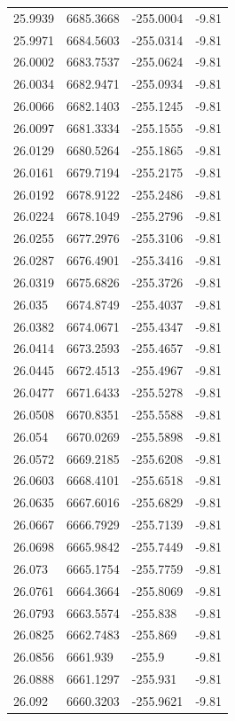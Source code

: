\begin{table}[H]
\begin{tabular}{llll}
25.9939 & 6685.3668 & -255.0004 & -9.81 \\
25.9971 & 6684.5603 & -255.0314 & -9.81 \\
26.0002 & 6683.7537 & -255.0624 & -9.81 \\
26.0034 & 6682.9471 & -255.0934 & -9.81 \\
26.0066 & 6682.1403 & -255.1245 & -9.81 \\
26.0097 & 6681.3334 & -255.1555 & -9.81 \\
26.0129 & 6680.5264 & -255.1865 & -9.81 \\
26.0161 & 6679.7194 & -255.2175 & -9.81 \\
26.0192 & 6678.9122 & -255.2486 & -9.81 \\
26.0224 & 6678.1049 & -255.2796 & -9.81 \\
26.0255 & 6677.2976 & -255.3106 & -9.81 \\
26.0287 & 6676.4901 & -255.3416 & -9.81 \\
26.0319 & 6675.6826 & -255.3726 & -9.81 \\
26.035 & 6674.8749 & -255.4037 & -9.81 \\
26.0382 & 6674.0671 & -255.4347 & -9.81 \\
26.0414 & 6673.2593 & -255.4657 & -9.81 \\
26.0445 & 6672.4513 & -255.4967 & -9.81 \\
26.0477 & 6671.6433 & -255.5278 & -9.81 \\
26.0508 & 6670.8351 & -255.5588 & -9.81 \\
26.054 & 6670.0269 & -255.5898 & -9.81 \\
26.0572 & 6669.2185 & -255.6208 & -9.81 \\
26.0603 & 6668.4101 & -255.6518 & -9.81 \\
26.0635 & 6667.6016 & -255.6829 & -9.81 \\
26.0667 & 6666.7929 & -255.7139 & -9.81 \\
26.0698 & 6665.9842 & -255.7449 & -9.81 \\
26.073 & 6665.1754 & -255.7759 & -9.81 \\
26.0761 & 6664.3664 & -255.8069 & -9.81 \\
26.0793 & 6663.5574 & -255.838 & -9.81 \\
26.0825 & 6662.7483 & -255.869 & -9.81 \\
26.0856 & 6661.939 & -255.9 & -9.81 \\
26.0888 & 6661.1297 & -255.931 & -9.81 \\
26.092 & 6660.3203 & -255.9621 & -9.81 \\

\end{tabular}
\end{table}

